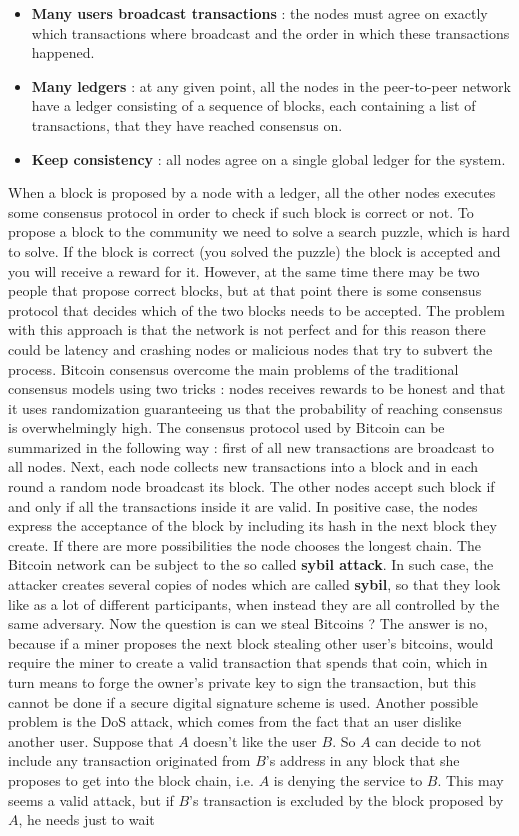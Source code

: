 \begin{itemize}
\item \textbf{Many users broadcast transactions} : the nodes must agree on exactly which transactions where broadcast and the order in which these transactions happened.
\item \textbf{Many ledgers} : at any given point, all the nodes in the peer-to-peer network have a ledger consisting of a sequence of blocks, each containing a list of transactions, that they have reached consensus on.
\item \textbf{Keep consistency} : all nodes agree on a single global ledger for the system.
\end{itemize}
When a block is proposed by a node with a ledger, all the other nodes executes some consensus protocol in order to check if such block is correct or not. To propose a block to the community we need to solve a search puzzle, which is hard to solve. If the block is correct (you solved the puzzle) the block is accepted and you will receive a reward for it. However, at the same time there may be two people that propose correct blocks, but at that point there is some consensus protocol that decides which of the two blocks needs to be accepted. The problem with this approach is that the network is not perfect and for this reason there could be latency and crashing nodes or malicious nodes that try to subvert the process. Bitcoin consensus overcome the main problems of the traditional consensus models using two tricks : nodes receives rewards to be honest and that it uses randomization guaranteeing us that the probability of reaching consensus is overwhelmingly high. The consensus protocol used by Bitcoin can be summarized in the following way : first of all new transactions are broadcast to all nodes. Next, each node collects new transactions into a block and in each round a random node broadcast its block. The other nodes accept such block if and only if all the transactions inside it are valid. In positive case, the nodes express the acceptance of the block by including its hash in the next block they create. If there are more possibilities the node chooses the longest chain. The Bitcoin network can be subject to the so called \textbf{sybil attack}. In such case, the attacker creates several copies of nodes which are called \textbf{sybil}, so that they look like as a lot of different participants, when instead they are all controlled by the same adversary. Now the question is can we steal Bitcoins ? The answer is no, because if a miner proposes the next block stealing other user's bitcoins, would require the miner to create a valid transaction that spends that coin, which in turn means to forge the owner's private key to sign the transaction, but this cannot be done if a secure digital signature scheme is used. Another possible problem is the DoS attack, which comes from the fact that an user dislike another user. Suppose that $A$ doesn't like the user $B$. So $A$ can decide to not include any transaction originated from $B$'s address in any block that she proposes to get into the block chain, i.e. $A$ is denying the service to $B$. This may seems a valid attack, but if $B$'s transaction is excluded by the block proposed by $A$, he needs just to wait 
